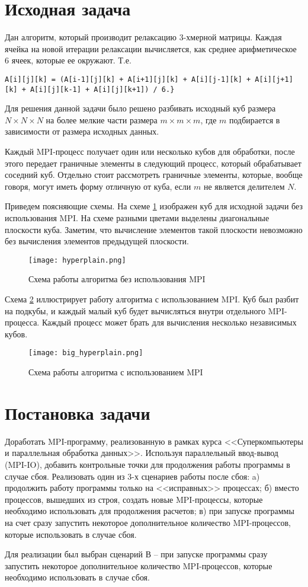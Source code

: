 \section{Исходная задача}
Дан алгоритм, который производит релаксацию 3-хмерной матрицы. Каждая ячейка
на новой итерации релаксации вычисляется, как среднее арифметическое 6 ячеек,
которые ее окружают.
Т.е.
\begin{lstlisting}
A[i][j][k] = (A[i-1][j][k] + A[i+1][j][k] + A[i][j-1][k] + A[i][j+1][k] + A[i][j][k-1] + A[i][j][k+1]) / 6.}
\end{lstlisting}

Для решения данной задачи было решено разбивать исходный куб размера
$N \times N \times N$ на более мелкие части размера $m \times m \times m$,
где $m$ подбирается в зависимости от размера исходных данных.

Каждый MPI-процесс получает один или несколько кубов для обработки, после этого
передает граничные элементы в следующий процесс, который обрабатывает соседний
куб. Отдельно стоит рассмотреть граничные элементы, которые, вообще говоря,
могут иметь форму отличную от куба, если $m$ не является делителем $N$.

Приведем поясняющие схемы. На схеме \ref{fig:hyperplain} изображен куб для
исходной задачи без использования MPI. На схеме разными цветами выделены
диагональные плоскости куба. Заметим, что вычисление элементов такой плоскости
невозможно без вычисления элементов предыдущей плоскости.

\begin{figure}[H]
    \centering
    \texttt{[image: hyperplain.png]}
    \caption{Схема работы алгоритма без использования MPI}
    \label{fig:hyperplain}
\end{figure}

Схема \ref{fig:big_hyperplain} иллюстрирует работу алгоритма с использованием
MPI. Куб был разбит на подкубы, и каждый малый куб будет вычисляться внутри
отдельного MPI-процесса. Каждый процесс может брать для вычисления несколько
независимых кубов.

\begin{figure}[H]
    \centering
    \texttt{[image: big\_hyperplain.png]}
    \caption{Схема работы алгоритма с использованием MPI}
    \label{fig:big_hyperplain}
\end{figure}

\section{Постановка задачи}
Доработать MPI-программу, реализованную в рамках курса <<Суперкомпьютеры и
параллельная обработка данных>>. Используя параллельный ввод-вывод (MPI-IO),
добавить контрольные точки для продолжения работы программы в случае сбоя.
Реализовать один из 3-х сценариев работы после сбоя: a) продолжить работу
программы только на <<исправных>> процессах; б) вместо процессов, вышедших из
строя, создать новые MPI-процессы, которые необходимо использовать для
продолжения расчетов; в) при запуске программы на счет сразу запустить
некоторое дополнительное количество MPI-процессов, которые использовать в
случае сбоя.

Для реализации был выбран сценарий В -- при запуске программы сразу запустить
некоторое дополнительное количество MPI-процессов, которые необходимо
использовать в случае сбоя.
